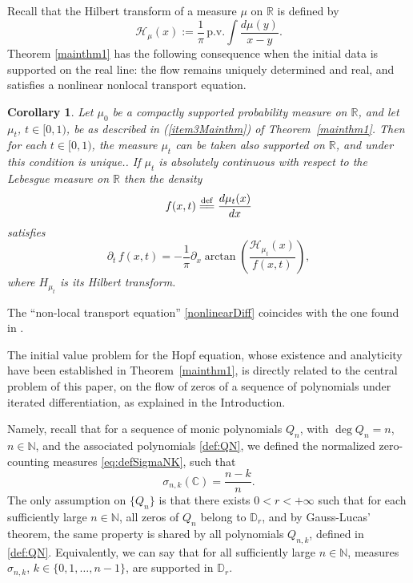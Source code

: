 \documentclass[reqno,11pt]{amsart}
\theoremstyle{plain}
\newtheorem{cor}[thm]{Corollary}
\theoremstyle{definition}
\theoremstyle{remark}
\numberwithin{equation}{section}
\numberwithin{equation}{section}
\newcommand{\N}{\mathbb{N}}
\newcommand{\C}{\mathbb{C}}
\newcommand{\D}{\mathbb{D}}
\newcommand{\R}{\mathbb{R}}
\newcommand{\isdef}{\overset{\mathrm{def}}{=\joinrel=}}
\begin{document}
Recall that the Hilbert transform of a measure $\mu$ on $\R$ is defined by
  \begin{equation} \label{defHillbertTransf}
		\mathcal H_\mu(x):= \frac{1}{\pi} \, \text{p.v.} \int \frac{d\mu(y)}{x-y}.
	\end{equation}
Theorem \ref{mainthm1} has the following consequence when the initial data is supported on the real line: the flow remains uniquely determined and real, and satisfies a nonlinear nonlocal transport equation.
\begin{cor}
 \label{itemNewMainthm} 
Let $ \mu_0$ be a compactly supported probability measure on $\R$, and let $\mu_t$, $t\in [0,1)$, be as described in (\ref{item3Mainthm}) of Theorem~\ref{mainthm1}. Then for each $t\in [0,1)$, the measure $\mu_t$ can be taken also supported on $\R$, and under this condition is unique.. If $ \mu_t $ is absolutely continuous with respect to the Lebesgue measure on $\R$ then the density
 		$$
 		f(x,t) \isdef \frac{d\mu_t(x)}{dx}
 		$$
 		satisfies
	\begin{equation} \label{nonlinearDiff}
 		 \partial_t\, f(x,t) = - \frac{1}{\pi}  \partial_x \arctan \left( \frac{\mathcal H_{\mu_t}(x)}{f(x,t)} \right) ,
 		\end{equation}
 	where $H_{\mu_t}$ is its Hilbert transform.
\end{cor}
The ``non-local transport equation'' \eqref{nonlinearDiff} coincides with the one found in \cite{MR4011508}.  

The initial value problem for the Hopf equation, whose existence and analyticity have been established in Theorem~\ref{mainthm1}, is directly related to the central problem of this paper, on the flow of zeros of a sequence of polynomials under iterated differentiation, as explained in the Introduction. 

Namely, recall that for a sequence of monic polynomials $Q_n$, with $\deg Q_n=n$, $n\in \N$, and the associated polynomials \eqref{def:QN}, we defined the normalized zero-counting measures \eqref{eq:defSigmaNK}, such that  
$$
\sigma_{n,k} \left( \C \right)= \frac{n-k}{n}. 
$$
The only assumption on $\{Q_n\}$ is that there exists $0<r<+\infty$ such that for each sufficiently large $n \in \N$, all zeros of $Q_n$ belong to $\D_r$, and by Gauss-Lucas' theorem, the same property is shared by all polynomials $Q_{n,k}$, defined in \eqref{def:QN}. Equivalently, we can say that for all sufficiently large $n \in \N$, measures $\sigma_{n,k}$, $k\in \{0, 1,\dots, n-1\}$, are supported in $\D_r$.
\end{document}
